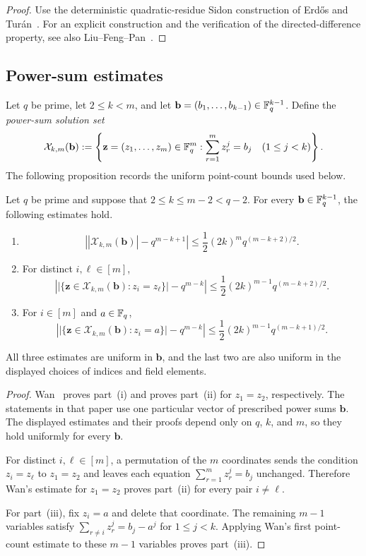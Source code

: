 \begin{proof}
Use the deterministic quadratic-residue Sidon construction of
Erd\H{o}s and Tur\'an~\cite{ErdosTuran41}.  For an explicit construction and
the verification of the directed-difference property, see also
Liu--Feng--Pan~\cite{LiuFengPan26}.
\end{proof}

\subsection{Power-sum estimates}

Let $q$ be prime, let $2\le k<m$, and let
$\mathbf b=(b_1,\ldots,b_{k-1})\in\mathbb F_q^{k-1}$.  Define the
\emph{power-sum solution set}
\[
 \mathcal X_{k,m}(\mathbf b)
 :=\left\{\mathbf z=(z_1,\ldots,z_m)\in\mathbb F_q^m:
   \sum_{r=1}^m z_r^j=b_j\quad(1\le j<k)\right\}.
\]
The following proposition records the uniform point-count
bounds used below.

\begin{proposition}
\label{prop:wan-power-sum-estimates}
Let $q$ be prime and suppose that
$2\le k\le m-2<q-2$.  For every
$\mathbf b\in\mathbb F_q^{k-1}$, the following estimates hold.
\begin{enumerate}[label=(\roman*)]
 \item
 \[
  \left||\mathcal X_{k,m}(\mathbf b)|-q^{m-k+1}\right|
  \le \frac12(2k)^m q^{(m-k+2)/2}.
 \]
 \item For distinct $i,\ell\in[m]$,
 \[
  \left|
   \bigl|\{\mathbf z\in\mathcal X_{k,m}(\mathbf b):z_i=z_\ell\}\bigr|
   -q^{m-k}
  \right|
  \le \frac12(2k)^{m-1}q^{(m-k+2)/2}.
 \]
 \item For $i\in[m]$ and $a\in\mathbb F_q$,
 \[
  \left|
   \bigl|\{\mathbf z\in\mathcal X_{k,m}(\mathbf b):z_i=a\}\bigr|
   -q^{m-k}
  \right|
  \le \frac12(2k)^{m-1}q^{(m-k+1)/2}.
 \]
\end{enumerate}
All three estimates are uniform in $\mathbf b$, and the last two are also
uniform in the displayed choices of indices and field elements.
\end{proposition}

\begin{proof}
Wan~\cite[Propositions~5.2 and~6.2]{wan2026np} proves
part~(i) and proves part~(ii) for $z_1=z_2$, respectively.  The statements in
that paper use one particular vector of prescribed power sums $\mathbf b$.
The displayed estimates and their proofs depend only on $q$, $k$, and $m$,
so they hold uniformly for every $\mathbf b$.

For distinct $i,\ell\in[m]$, a permutation of the $m$ coordinates sends the
condition $z_i=z_\ell$ to $z_1=z_2$ and leaves each equation
$\sum_{r=1}^m z_r^j=b_j$ unchanged.  Therefore Wan's estimate for
$z_1=z_2$ proves part~(ii) for every pair $i\ne\ell$.

For part~(iii), fix $z_i=a$ and delete that coordinate.  The remaining
$m-1$ variables satisfy $\sum_{r\ne i}z_r^j=b_j-a^j$ for $1\le j<k$.
Applying Wan's first point-count estimate to these $m-1$ variables proves
part~(iii).
\end{proof}
